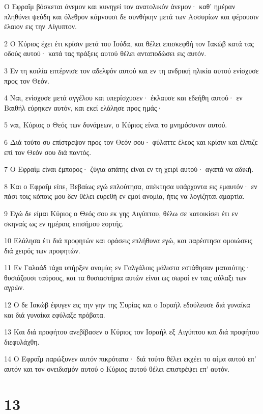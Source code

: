 \par Ο Εφραΐμ βόσκεται άνεμον και κυνηγεί τον ανατολικόν άνεμον· καθ' ημέραν πληθύνει ψεύδη και όλεθρον κάμνουσι δε συνθήκην μετά των Ασσυρίων και φέρουσιν έλαιον εις την Αίγυπτον.
\par 2 Ο Κύριος έχει έτι κρίσιν μετά του Ιούδα, και θέλει επισκεφθή τον Ιακώβ κατά τας οδούς αυτού· κατά τας πράξεις αυτού θέλει ανταποδώσει εις αυτόν.
\par 3 Εν τη κοιλία επτέρνισε τον αδελφόν αυτού και εν τη ανδρική ηλικία αυτού ενίσχυσε προς τον Θεόν.
\par 4 Ναι, ενίσχυσε μετά αγγέλου και υπερίσχυσεν· έκλαυσε και εδεήθη αυτού· εν Βαιθήλ εύρηκεν αυτόν, και εκεί ελάλησε προς ημάς·
\par 5 ναι, Κύριος ο Θεός των δυνάμεων, ο Κύριος είναι το μνημόσυνον αυτού.
\par 6 Διά τούτο συ επίστρεψον προς τον Θεόν σου· φύλαττε έλεος και κρίσιν και έλπιζε επί τον Θεόν σου διά παντός.
\par 7 Ο Εφραΐμ είναι έμπορος· ζύγια απάτης είναι εν τη χειρί αυτού· αγαπά να αδική.
\par 8 Και ο Εφραΐμ είπε, Βεβαίως εγώ επλούτησα, απέκτησα υπάρχοντα εις εμαυτόν· εν πάσι τοις κόποις μου δεν θέλει ευρεθή εν εμοί ανομία, ήτις να λογίζηται αμαρτία.
\par 9 Εγώ δε είμαι Κύριος ο Θεός σου εκ γης Αιγύπτου, θέλω σε κατοικίσει έτι εν σκηναίς ως εν ημέραις επισήμου εορτής.
\par 10 Ελάλησα έτι διά προφητών και οράσεις επλήθυνα εγώ, και παρέστησα ομοιώσεις διά χειρός των προφητών.
\par 11 Εν Γαλαάδ τάχα υπήρξεν ανομία; εν Γαλγάλοις μάλιστα εστάθησαν ματαιότης· θυσιάζουσι ταύρους, και τα θυσιαστήρια αυτών είναι ως σωροί εν ταις αύλαξι των αγρών.
\par 12 Ο δε Ιακώβ έφυγεν εις την γην της Συρίας και ο Ισραήλ εδούλευσε διά γυναίκα και διά γυναίκα εφύλαξε πρόβατα.
\par 13 Και διά προφήτου ανεβίβασεν ο Κύριος τον Ισραήλ εξ Αιγύπτου και διά προφήτου διεφυλάχθη.
\par 14 Ο Εφραΐμ παρώξυνεν αυτόν πικρότατα· διά τούτο θέλει εκχέει το αίμα αυτού επ' αυτόν και τον ονειδισμόν αυτού ο Κύριος αυτού θέλει επιστρέψει επ' αυτόν.

\chapter{13}

